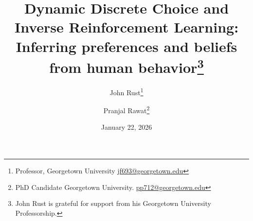 \documentclass[11pt]{article}
\title{ \vspace*{1cm} \hspace*{-0.5cm}Dynamic Discrete Choice and Inverse Reinforcement Learning:\\
Inferring preferences and beliefs from human behavior\footnote{John Rust is grateful for support
from his Georgetown University Professorship.
}}
\author{John Rust\thanks{Professor, Georgetown University
\href{mailto:jf693@georgetown.edu}{jf693@georgetown.edu}} \and Pranjal Rawat\thanks{PhD Candidate Georgetown University.  \href{mailto:pp712@georgetown.edu}{pp712@georgetown.edu}}}
\date{ \vspace*{0.5cm} January 22, 2026 \\ \bigskip {\Large PRELIMINARY DRAFT: NOT FOR CIRCULATION} }
\begin{document}
\bgroup
\let\footnoterule\relax

\maketitle


\thispagestyle{empty}

\clearpage
\egroup
\setcounter{page}{1}






%









\clearpage
\begin{singlespace}
%
%


\end{singlespace}



% 
% 
\end{document}
